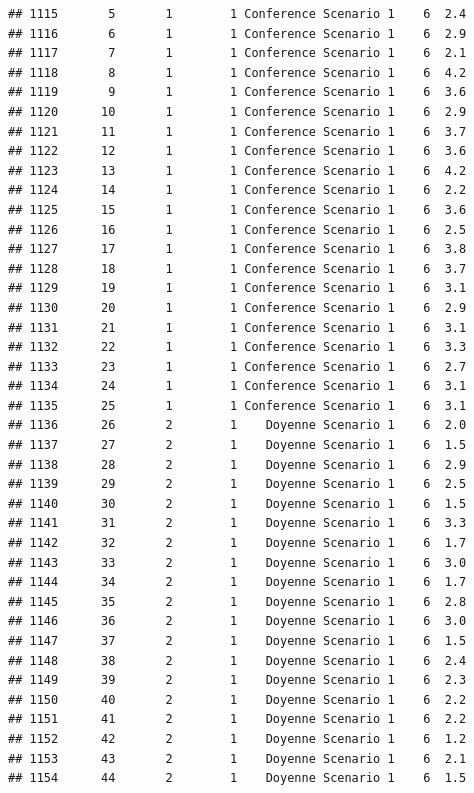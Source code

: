\documentclass[
]{article}
\begin{document}
\begin{verbatim}
## 1115       5       1        1 Conference Scenario 1    6  2.4
## 1116       6       1        1 Conference Scenario 1    6  2.9
## 1117       7       1        1 Conference Scenario 1    6  2.1
## 1118       8       1        1 Conference Scenario 1    6  4.2
## 1119       9       1        1 Conference Scenario 1    6  3.6
## 1120      10       1        1 Conference Scenario 1    6  2.9
## 1121      11       1        1 Conference Scenario 1    6  3.7
## 1122      12       1        1 Conference Scenario 1    6  3.6
## 1123      13       1        1 Conference Scenario 1    6  4.2
## 1124      14       1        1 Conference Scenario 1    6  2.2
## 1125      15       1        1 Conference Scenario 1    6  3.6
## 1126      16       1        1 Conference Scenario 1    6  2.5
## 1127      17       1        1 Conference Scenario 1    6  3.8
## 1128      18       1        1 Conference Scenario 1    6  3.7
## 1129      19       1        1 Conference Scenario 1    6  3.1
## 1130      20       1        1 Conference Scenario 1    6  2.9
## 1131      21       1        1 Conference Scenario 1    6  3.1
## 1132      22       1        1 Conference Scenario 1    6  3.3
## 1133      23       1        1 Conference Scenario 1    6  2.7
## 1134      24       1        1 Conference Scenario 1    6  3.1
## 1135      25       1        1 Conference Scenario 1    6  3.1
## 1136      26       2        1    Doyenne Scenario 1    6  2.0
## 1137      27       2        1    Doyenne Scenario 1    6  1.5
## 1138      28       2        1    Doyenne Scenario 1    6  2.9
## 1139      29       2        1    Doyenne Scenario 1    6  2.5
## 1140      30       2        1    Doyenne Scenario 1    6  1.5
## 1141      31       2        1    Doyenne Scenario 1    6  3.3
## 1142      32       2        1    Doyenne Scenario 1    6  1.7
## 1143      33       2        1    Doyenne Scenario 1    6  3.0
## 1144      34       2        1    Doyenne Scenario 1    6  1.7
## 1145      35       2        1    Doyenne Scenario 1    6  2.8
## 1146      36       2        1    Doyenne Scenario 1    6  3.0
## 1147      37       2        1    Doyenne Scenario 1    6  1.5
## 1148      38       2        1    Doyenne Scenario 1    6  2.4
## 1149      39       2        1    Doyenne Scenario 1    6  2.3
## 1150      40       2        1    Doyenne Scenario 1    6  2.2
## 1151      41       2        1    Doyenne Scenario 1    6  2.2
## 1152      42       2        1    Doyenne Scenario 1    6  1.2
## 1153      43       2        1    Doyenne Scenario 1    6  2.1
## 1154      44       2        1    Doyenne Scenario 1    6  1.5

\end{verbatim}
\end{document}
